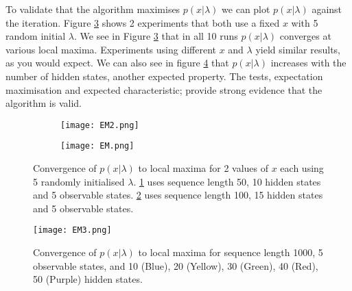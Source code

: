 To validate that the algorithm maximises $p(x|\lambda)$ we can plot $p(x|\lambda)$ against the iteration.
Figure \ref{fig:em} shows 2 experiments that both use a fixed $x$ with 5 random initial $\lambda$.
We see in Figure \ref{fig:em} that in all 10 runs $p(x|\lambda)$ converges at various local maxima.
Experiments using different $x$ and $\lambda$ yield similar results, as you would expect.
We can also see in figure \ref{fig:em3} that $p(x|\lambda)$ increases with the number of hidden states, another expected property.
The tests, expectation maximisation and expected characteristic; provide strong evidence that the algorithm is valid.

\begin{figure}[h!]
    \begin{center}
    \begin{subfigure}{.5\textwidth}
        \begin{center}
    \texttt{[image: EM2.png]}
    \caption{}
    \label{fig:em1}
    \end{center}
    \end{subfigure}%
    \begin{subfigure}{.5\textwidth}
        \begin{center}
        \texttt{[image: EM.png]}
        \caption{}
        \label{fig:em2}
    \end{center}
        \end{subfigure}%
        \caption{Convergence of $p(x|\lambda)$ to local maxima for 2 values of $x$ each using 5 randomly initialised $\lambda$. \ref{fig:em1} uses sequence length 50, 10 hidden states and 5 observable states. \ref{fig:em2} uses sequence length 100, 15 hidden states and 5 observable states.}
    \label{fig:em}
    \end{center}
    \end{figure}

    \begin{figure}[h!]
        \begin{center}
        
        \texttt{[image: EM3.png]}
        \caption{Convergence of $p(x|\lambda)$ to local maxima for sequence length 1000, 5 observable states, and 10 (Blue), 20 (Yellow), 30 (Green), 40 (Red), 50 (Purple) hidden states.}
        \label{fig:em3}
        
        \end{center}
        \end{figure}